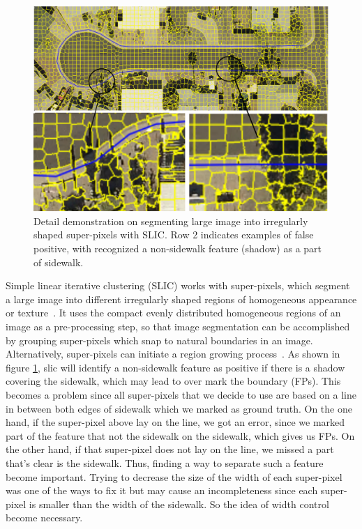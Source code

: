 \begin{figure}[H]
    \centering
    \includegraphics[width=\textwidth]{Figures/slic_sample1.pdf}
    \caption[Example of Simple Linear Iterative Clustering]{Detail demonstration on segmenting large image into irregularly shaped super-pixels with \ac{SLIC}. Row 2 indicates examples of false positive, with recognized a non-sidewalk feature (shadow) as a part of sidewalk.}
    \label{fig:slic}
\end{figure}

Simple linear iterative clustering (SLIC) works with super-pixels, which segment a large image into different irregularly shaped regions of homogeneous appearance or texture~\cite{Achanta:149300}. 
It uses the compact evenly distributed homogeneous regions of an image as a pre-processing step, so that image segmentation can be accomplished by grouping super-pixels which snap to natural boundaries in an image. 
Alternatively, super-pixels can initiate a region growing process~\cite{Borovec2017-fz}. 
As shown in figure \ref{fig:slic}, slic will identify a non-sidewalk feature as positive if there is a shadow covering the sidewalk, which may lead to over mark the boundary (\aclp{FP}).
This becomes a problem since all super-pixels that we decide to use are based on a line in between both edges of sidewalk which we marked as ground truth. 
On the one hand, if the super-pixel above lay on the line, we got an error, since we marked part of the feature that not the sidewalk on the sidewalk, which gives us \aclp{FP}. 
On the other hand, if that super-pixel does not lay on the line, we missed a part that's clear is the sidewalk. Thus, finding a way to separate such a feature become important. 
Trying to decrease the size of the width of each super-pixel was one of the ways to fix it but may cause an incompleteness since each super-pixel is smaller than the width of the sidewalk.
So the idea of width control become necessary.

